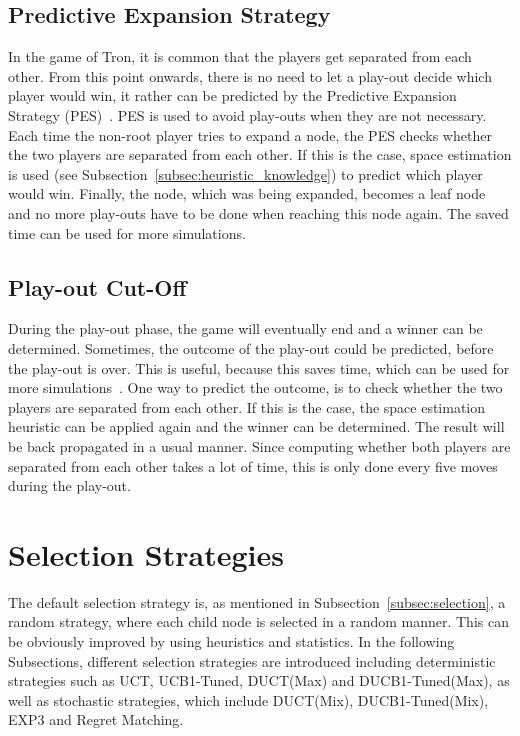 \documentclass{article}
\begin{document}
\subsection{Predictive Expansion Strategy}
\label{subsec:pes}
In the game of Tron, it is common that the players get separated from each other. From this point onwards, there is no need to let a play-out decide which player would win, it rather can be predicted by the Predictive Expansion Strategy (PES)~\cite{teuling_tron}. PES is used to avoid play-outs when they are not necessary. Each time the non-root player tries to expand a node, the PES checks whether the two players are separated from each other. If this is the case, space estimation is used (see Subsection~\ref{subsec:heuristic_knowledge}) to predict which player would win. Finally, the node, which was being expanded, becomes a leaf node and no more play-outs have to be done when reaching this node again. The saved time can be used for more simulations. 

\subsection{Play-out Cut-Off}
\label{subsec:play_out_cut_off}
During the play-out phase, the game will eventually end and a winner can be determined. Sometimes, the outcome of the play-out could be predicted, before the play-out is over. This is useful, because this saves time, which can be used for more simulations~\cite{teuling_tron}. One way to predict the outcome, is to check whether the two players are separated from each other. If this is the case, the space estimation heuristic can be applied again and the winner can be determined. The result will be back propagated in a usual manner. Since computing whether both players are separated from each other takes a lot of time, this is only done every five moves during the play-out.

\section{Selection Strategies}
\label{sec:selection_strategies}
The default selection strategy is, as mentioned in Subsection~\ref{subsec:selection}, a random strategy, where each child node is selected in a random manner. This can be obviously improved by using heuristics and statistics. In the following Subsections, different selection strategies are introduced including deterministic strategies such as UCT, UCB1-Tuned, DUCT(Max) and DUCB1-Tuned(Max), as well as stochastic strategies, which include DUCT(Mix), DUCB1-Tuned(Mix), EXP3 and Regret Matching. 
\end{document}
